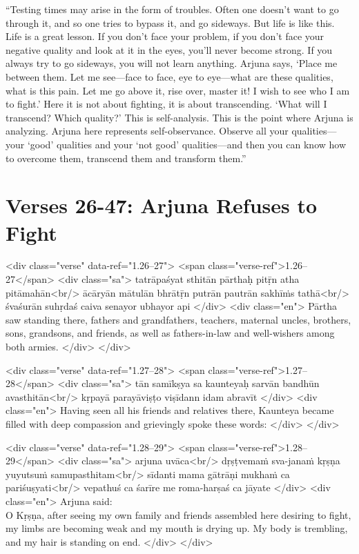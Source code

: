 \enquote{Testing times may arise in the form of troubles. Often one doesn’t want to go through it, and so one tries to bypass it, and go sideways. But life is like this. Life is a great lesson. If you don’t face your problem, if you don’t face your negative quality and look at it in the eyes, you’ll never become strong. If you always try to go sideways, you will not learn anything. Arjuna says, \enquote{Place me between them. Let me see---face to face, eye to eye---what are these qualities, what is this pain. Let me go above it, rise over, master it! I wish to see who I am to fight.} Here it is not about fighting, it is about transcending. \enquote{What will I transcend? Which quality?} This is self-analysis. This is the point where Arjuna is analyzing. Arjuna here represents self-observance. Observe all your qualities---your \enquote{good} qualities and your \enquote{not good} qualities---and then you can know how to overcome them, transcend them and transform them.}

\section{Verses 26-47: Arjuna Refuses to Fight}\label{sec-verses-26-47-arjuna-refuses-to-fight}

\begin{html}
<div class="verse" data-ref="1.26–27">
  <span class="verse-ref">1.26–27</span>
  <div class="sa">
    tatrāpaśyat sthitān pārthaḥ pitṝn atha pitāmahān<br/>
    ācāryān mātulān bhrātṝn putrān pautrān sakhīṁs tathā<br/>
    śvaśurān suhṛdaś caiva senayor ubhayor api
  </div>
  <div class="en">
    Pārtha saw standing there, fathers and grandfathers, teachers, maternal uncles, brothers, sons, grandsons, and friends, as well as fathers-in-law and well-wishers among both armies.
  </div>
</div>
\end{html}



\begin{html}
<div class="verse" data-ref="1.27–28">
  <span class="verse-ref">1.27–28</span>
  <div class="sa">
    tān samīkṣya sa kaunteyaḥ sarvān bandhūn avasthitān<br/>
    kṛpayā parayāviṣṭo viṣīdann idam abravīt
  </div>
  <div class="en">
    Having seen all his friends and relatives there, Kaunteya became filled with deep compassion and grievingly spoke these words:
  </div>
</div>
\end{html}



\begin{html}
<div class="verse" data-ref="1.28–29">
  <span class="verse-ref">1.28–29</span>
  <div class="sa">
    arjuna uvāca<br/>
    dṛṣṭvemaṁ sva-janaṁ kṛṣṇa yuyutsuṁ samupasthitam<br/>
    sīdanti mama gātrāṇi mukhaṁ ca pariśuṣyati<br/>
    vepathuś ca śarīre me roma-harṣaś ca jāyate
  </div>
  <div class="en">
    \hspace*{1em}Arjuna said: \\ O Kṛṣṇa, after seeing my own family and friends assembled here desiring to fight, my limbs are becoming weak and my mouth is drying up. My body is trembling, and my hair is standing on end.
  </div>
</div>
\end{html}



